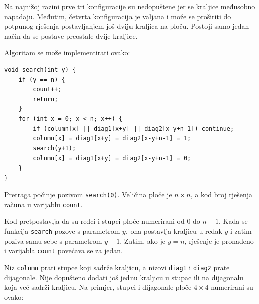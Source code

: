 Na najnižoj razini prve tri konfiguracije
su nedopuštene jer se kraljice međusobno napadaju.
Međutim, četvrta konfiguracija je valjana
i može se proširiti do potpunog rješenja
postavljanjem još dviju kraljica na ploču.
Postoji samo jedan način da se postave preostale dvije kraljice.

\begin{samepage}
Algoritam se može implementirati ovako:
\begin{lstlisting}
void search(int y) {
    if (y == n) {
        count++;
        return;
    }
    for (int x = 0; x < n; x++) {
        if (column[x] || diag1[x+y] || diag2[x-y+n-1]) continue;
        column[x] = diag1[x+y] = diag2[x-y+n-1] = 1;
        search(y+1);
        column[x] = diag1[x+y] = diag2[x-y+n-1] = 0;
    }
}
\end{lstlisting}
\end{samepage}
Pretraga počinje pozivom \texttt{search(0)}.
Veličina ploče je $n \times n$,
a kod broj rješenja računa
u varijablu \texttt{count}.

Kod pretpostavlja da su redci i stupci
ploče numerirani od 0 do $n-1$.
Kada se funkcija \texttt{search}
pozove s parametrom $y$,
ona postavlja kraljicu u redak $y$
i zatim poziva samu sebe s parametrom $y+1$.
Zatim, ako je $y=n$, rješenje je pronađeno
i varijabla \texttt{count} povećava se za jedan.

Niz \texttt{column} prati stupce
koji sadrže kraljicu,
a nizovi \texttt{diag1} i \texttt{diag2}
prate dijagonale.
Nije dopušteno dodati još jednu kraljicu u
stupac ili na dijagonalu koja već sadrži kraljicu. 
Na primjer, stupci i dijagonale
ploče $4 \times 4$ numerirani su ovako:

